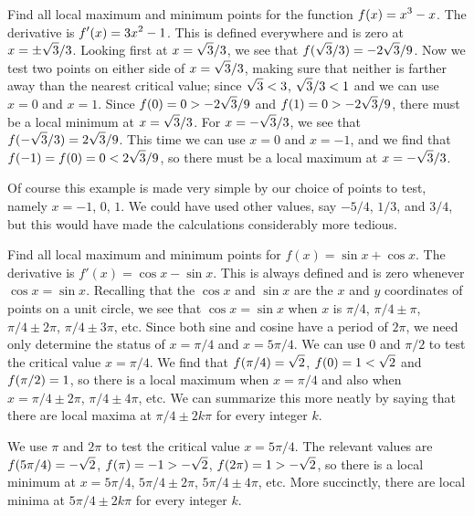 \begin{example}
Find all local maximum and minimum points for the function 
$\displaystyle f(x)=x^3-x$. The derivative is $\displaystyle f'(x)=3x^2-1$. This is defined
everywhere and is zero at $\displaystyle x=\pm \sqrt{3}/3$. Looking first at
$\displaystyle x=\sqrt{3}/3$, we see that $\displaystyle f(\sqrt{3}/3)=-2\sqrt{3}/9$. Now we test
two points on either side of 
$\displaystyle x=\sqrt{3}/3$, making sure that neither is farther away than
the nearest critical value; since $\displaystyle \sqrt{3}<3$, $\displaystyle \sqrt{3}/3<1$ and
we can use $x=0$ and $x=1$. Since
$\displaystyle f(0)=0>-2\sqrt{3}/9$
and $\displaystyle f(1)=0>-2\sqrt{3}/9$, there must be a local minimum at 
$\displaystyle x=\sqrt{3}/3$. For $\displaystyle x=-\sqrt{3}/3$, we see that
$\displaystyle f(-\sqrt{3}/3)=2\sqrt{3}/9$. This time we can use $x=0$ and $x=-1$,
and we find that $\displaystyle f(-1)=f(0)=0< 2\sqrt{3}/9$, so there must be a local
maximum at $\displaystyle x=-\sqrt{3}/3$.
\end{example}
\label{exam:simple cubic}

Of course this example is made very simple by our choice of points to
test, namely $x=-1$, $0$, $1$. We could have used other values, say
$-5/4$, $1/3$, and $3/4$, but this would have made the calculations
considerably more tedious.

\begin{example}
\label{example:max and min}
Find all local maximum and minimum points for 
$f(x)=\sin x+\cos x$. The derivative is $f'(x)=\cos x-\sin x$. This is
always defined and is zero whenever $\cos x=\sin x$. Recalling that
the $\cos x$ and $\sin x$ are the $x$ and $y$ coordinates of points on
a unit circle, we see that $\cos x=\sin x$ when $x$ is $\pi/4$, 
$\pi/4\pm\pi$, $\pi/4\pm2\pi$, $\pi/4\pm3\pi$, etc. Since both sine
and cosine have a period of $2\pi$, we need only determine the status
of $x=\pi/4$ and $x=5\pi/4$. We can use $0$ and $\pi/2$ to test the
critical value $x= \pi/4$. 
We find that $\displaystyle f(\pi/4)=\sqrt{2}$, $\displaystyle f(0)=1<\sqrt{2}$ and $\displaystyle f(\pi/2)=1$,
so there is a local maximum when $x=\pi/4$ and also when
$x=\pi/4\pm2\pi$, $\pi/4\pm4\pi$, etc. We can summarize this more
neatly by saying that there are local maxima at $\pi/4\pm 2k\pi$ for
every integer $k$.

We use $\pi$ and $2\pi$ to test the critical value $x=5\pi/4$. The
relevant values are $\displaystyle f(5\pi/4)=-\sqrt2$, $\displaystyle f(\pi)=-1>-\sqrt2$,
$\displaystyle f(2\pi)=1>-\sqrt2$, so there is a local minimum at $x=5\pi/4$,
$5\pi/4\pm2\pi$, $5\pi/4\pm4\pi$, etc. More succinctly, there are
local minima at $5\pi/4\pm 2k\pi$ for
every integer $k$.
\end{example}

